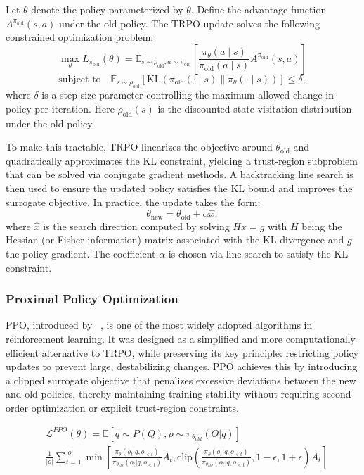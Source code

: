 Let $\theta$ denote the policy parameterized by $\theta$. Define the advantage function $A^{\pi_{\text{old}}}(s, a)$ under the old policy. The TRPO update solves the following constrained optimization problem:
$$
\max_{\theta} L_{\pi_{\text{old}}}(\theta) = \mathbb{E}_{s \sim \rho_{\text{old}}, a \sim \pi_{\text{old}}} \left[ \frac{\pi_{\theta}(a \mid s)}{\pi_{\text{old}}(a \mid s)} A^{\pi_{\text{old}}}(s, a) \right]
$$
$$
\text{subject to} \quad \mathbb{E}_{s \sim \rho_{\text{old}}} \left[ \text{KL}(\pi_{\text{old}}(\cdot \mid s) \parallel \pi_{\theta}(\cdot \mid s)) \right] \leq \delta,
$$
where $\delta$ is a step size parameter controlling the maximum allowed change in policy per iteration. Here $\rho_{\text{old}}(s)$ is the discounted state visitation distribution under the old policy.

To make this tractable, TRPO linearizes the objective around $\theta_{\text{old}}$ and quadratically approximates the KL constraint, yielding a trust-region subproblem that can be solved via conjugate gradient methods. A backtracking line search is then used to ensure the updated policy satisfies the KL bound and improves the surrogate objective. In practice, the update takes the form:
$$\theta_{\text{new}} = \theta_{\text{old}} + \alpha \hat{x},$$
where $\hat{x}$ is the search direction computed by solving $H \hat{x} = g$ with $H$ being the Hessian (or Fisher information) matrix associated with the KL divergence and $g$ the policy gradient. The coefficient $\alpha$ is chosen via line search to satisfy the KL constraint.

\subsubsection{Proximal Policy Optimization}
PPO, introduced by \citeauthor{schulman2017proximal}~\cite{schulman2017proximal}, is one of the most widely adopted algorithms in reinforcement learning. It was designed as a simplified and more computationally efficient alternative to TRPO, while preserving its key principle: restricting policy updates to prevent large, destabilizing changes. PPO achieves this by introducing a clipped surrogate objective that penalizes excessive deviations between the new and old policies, thereby maintaining training stability without requiring second-order optimization or explicit trust-region constraints.

\begin{equation}
\begin{split}
    & \mathcal{L}^{PPO}(\theta) = \mathbb{E}[q \sim P(Q), \rho \sim \pi_{\theta_{old}}({O}|q)] \\ 
    & \frac{1}{|{o}|}\sum_{t=1}^{|{o}|} \min\left[\frac{\pi_{\theta}(o_t|q, {o}_{<t})}{\pi_{\theta_{old}}(o_t|q, {o}_{<t})}A_t, \text{clip}\left(\frac{\pi_{\theta}(o_t|q, {o}_{<t})}{\pi_{\theta_{old}}(o_t|q, {o}_{<t})}, 1-\epsilon, 1+\epsilon\right)A_t\right]
\end{split}
\end{equation} 

